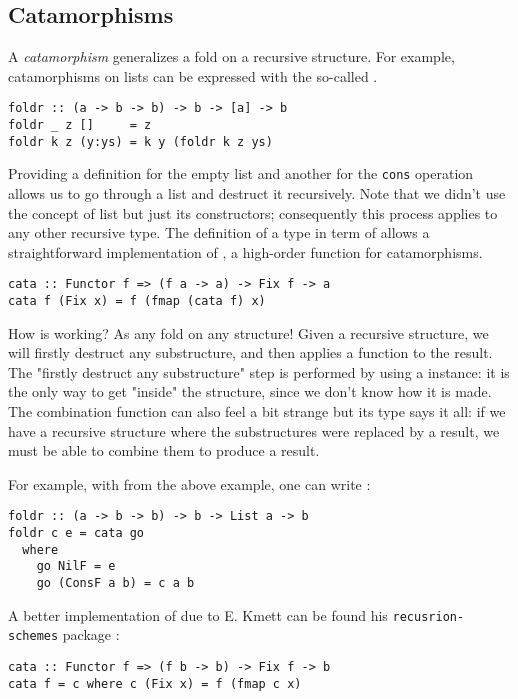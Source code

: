 \subsection{Catamorphisms}
A \emph{catamorphism} generalizes a fold on a recursive structure. For example, catamorphisms on lists can be expressed with the so-called .
\begin{verbatim}
foldr :: (a -> b -> b) -> b -> [a] -> b
foldr _ z []     = z
foldr k z (y:ys) = k y (foldr k z ys)
\end{verbatim}
Providing a definition for the empty list and another for the \verb|cons| operation allows us to go through a list and destruct it recursively. Note that we didn't use the concept of list but just its constructors; consequently this process applies to any other recursive type. The definition of a type in term of  allows a straightforward implementation of , a high-order function for catamorphisms.

\begin{verbatim}
cata :: Functor f => (f a -> a) -> Fix f -> a
cata f (Fix x) = f (fmap (cata f) x)
\end{verbatim}
\noindent How  is working? As any fold on any structure! Given a recursive structure, we will firstly destruct any substructure, and then applies a function to the result. The "firstly destruct any substructure" step is performed by using a  instance: it is the only way to get "inside" the structure, since we don't know how it is made. The combination function can also feel a bit strange but its type says it all: if we have a recursive structure where the substructures were replaced by a result, we must be able to combine them to produce a result.

For example, with  from the above example, one can write :
\begin{verbatim}
foldr :: (a -> b -> b) -> b -> List a -> b
foldr c e = cata go
  where
    go NilF = e
    go (ConsF a b) = c a b
\end{verbatim}

\noindent A better implementation of  due to E. Kmett can be found his \verb|recusrion-schemes| package \cite{ekmett:eschems}:

\begin{verbatim}
cata :: Functor f => (f b -> b) -> Fix f -> b
cata f = c where c (Fix x) = f (fmap c x)
\end{verbatim}

